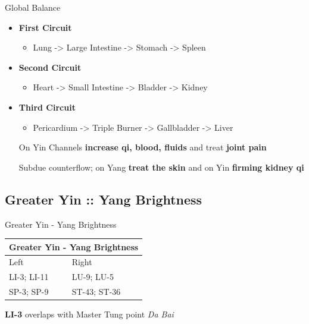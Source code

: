 \begin{frame}{Global Balance}

\begin{itemize}

\item \textbf{First Circuit}
\begin{itemize}
\item Lung -> Large Intestine -> Stomach -> Spleen
\end{itemize}

\item \textbf{Second Circuit}
\begin{itemize}
\item Heart -> Small Intestine -> Bladder -> Kidney
\end{itemize}

\item \textbf{Third Circuit}
\begin{itemize}
\item Pericardium -> Triple Burner -> Gallbladder -> Liver
\end{itemize}

\begin{stream}
On Yin Channels \textbf{increase qi, blood, fluids} and treat \textbf{joint pain}
\end{stream}

\begin{unite}
Subdue counterflow; on Yang \textbf{treat the skin} and on Yin \textbf{firming kidney qi}
\end{unite}

\end{itemize}

\end{frame}

\subsection{Greater Yin :: Yang Brightness}
\begin{frame}{Greater Yin - Yang Brightness}

\begin{table}[]
\begin{tabular}{@{}ll@{}}
\toprule
\multicolumn{2}{l}{Greater Yin - Yang Brightness} \\ \midrule
Left                    & Right                   \\
LI-3; LI-11             & LU-9; LU-5              \\
SP-3; SP-9              & ST-43; ST-36            \\ \bottomrule
\end{tabular}
\end{table}

\vspace{2em}

\textbf{LI-3} overlaps with Master Tung point \textit{Da Bai}

\end{frame}

